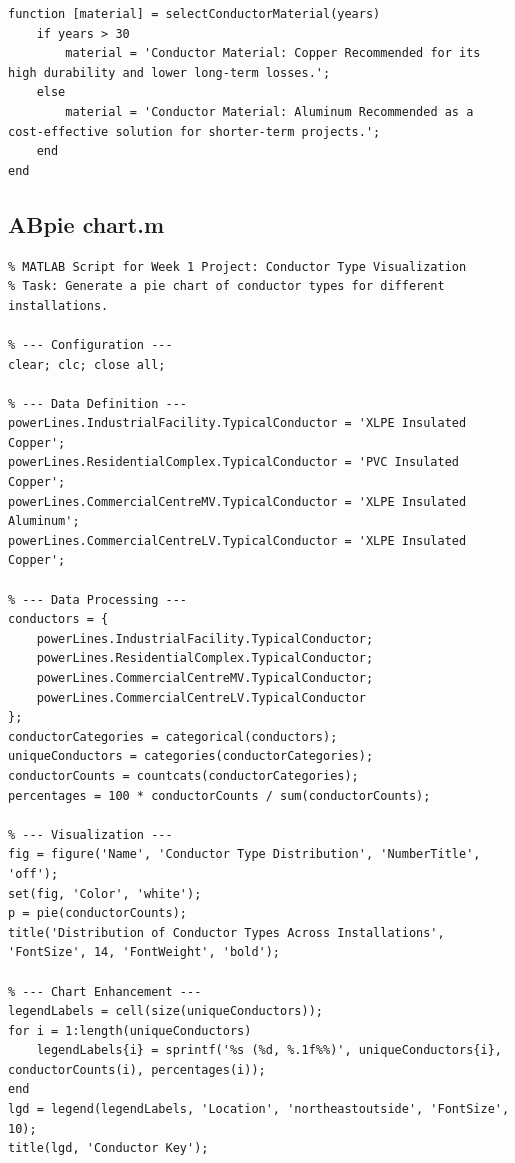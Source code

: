 \documentclass[12pt, a4paper]{article}
\begin{document}
\begin{lstlisting}
function [material] = selectConductorMaterial(years)
    if years > 30
        material = 'Conductor Material: Copper Recommended for its high durability and lower long-term losses.';
    else
        material = 'Conductor Material: Aluminum Recommended as a cost-effective solution for shorter-term projects.';
    end
end
\end{lstlisting}

\subsection{ABpie chart.m}
\begin{lstlisting}
% MATLAB Script for Week 1 Project: Conductor Type Visualization
% Task: Generate a pie chart of conductor types for different installations.

% --- Configuration ---
clear; clc; close all;

% --- Data Definition ---
powerLines.IndustrialFacility.TypicalConductor = 'XLPE Insulated Copper';
powerLines.ResidentialComplex.TypicalConductor = 'PVC Insulated Copper';
powerLines.CommercialCentreMV.TypicalConductor = 'XLPE Insulated Aluminum';
powerLines.CommercialCentreLV.TypicalConductor = 'XLPE Insulated Copper';

% --- Data Processing ---
conductors = {
    powerLines.IndustrialFacility.TypicalConductor;
    powerLines.ResidentialComplex.TypicalConductor;
    powerLines.CommercialCentreMV.TypicalConductor;
    powerLines.CommercialCentreLV.TypicalConductor
};
conductorCategories = categorical(conductors);
uniqueConductors = categories(conductorCategories);
conductorCounts = countcats(conductorCategories);
percentages = 100 * conductorCounts / sum(conductorCounts);

% --- Visualization ---
fig = figure('Name', 'Conductor Type Distribution', 'NumberTitle', 'off');
set(fig, 'Color', 'white');
p = pie(conductorCounts);
title('Distribution of Conductor Types Across Installations', 'FontSize', 14, 'FontWeight', 'bold');

% --- Chart Enhancement ---
legendLabels = cell(size(uniqueConductors));
for i = 1:length(uniqueConductors)
    legendLabels{i} = sprintf('%s (%d, %.1f%%)', uniqueConductors{i}, conductorCounts(i), percentages(i));
end
lgd = legend(legendLabels, 'Location', 'northeastoutside', 'FontSize', 10);
title(lgd, 'Conductor Key');
\end{lstlisting}
\end{document}

